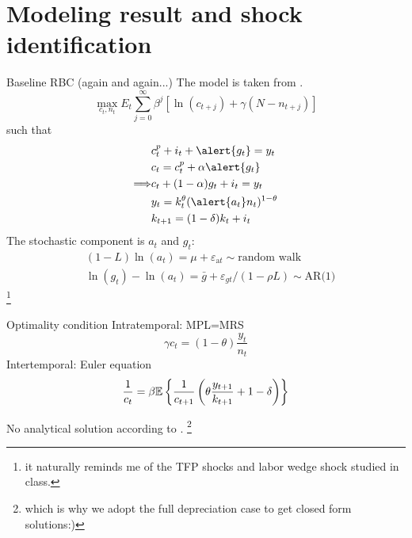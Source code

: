 \documentclass[10pt]{beamer}
\begin{document}
\section{Modeling result and shock identification}

\begin{frame}{Baseline RBC (again and again...)}
    The model is taken from \cite{christiano_eichenbaum_2020}.
    \begin{equation}
        \max_{c_t,n_t} E_{t} \sum_{j=0}^{\infty} \beta^{j} \left[\ln (c_{t+j})+\gamma(N-n_{t+j})\right]
    \end{equation}
    such that
    \begin{align*}
                        & c_t^p + i_t + \alert{g_t} = y_t                 \\
                        & c_t = c_t^p+\alpha \alert{g_t}                  \\
        \Longrightarrow & c_t + (1-\alpha)g_t +i_t=y_t                    \\
                        & y_t = k_t^{\theta} (\alert{a_t} n_t)^{1-\theta} \\
                        & k_{t+1} = (1-\delta) k_t + i_t                  \\
    \end{align*}
    The \alert{stochastic} component is $a_t$ and $g_t$:
    \begin{align}
         & (1-L) \ln \left(a_{t}\right)=\mu+\varepsilon_{\mathrm{a} t}            \sim \text{random walk}        \\
         & \ln \left(g_{t}\right)-\ln \left(a_{t}\right)=\bar{g}+\varepsilon_{g t} /(1-\rho L) \sim \text{AR(1)}
    \end{align}\footnote{it naturally reminds me of the TFP shocks and labor wedge shock studied in class.}
\end{frame}
\begin{frame}{Optimality condition}
    Intratemporal: MPL=MRS
    \begin{equation}
        \gamma c_t = (1-\theta)\frac{y_t}{n_t}
    \end{equation}
    Intertemporal: Euler equation
    \begin{equation}
        \frac{1}{c_t}=\beta \mathbb{E}\left\{\frac{1}{c_{t+1}}\left(\theta\frac{y_{t+1}}{k_{t+1}}+1-\delta\right)\right\}
    \end{equation}

    \alert{No analytical solution} according to \cite{christiano_eichenbaum_2020}. \footnote{which is why we adopt the full depreciation case to get closed form solutions:)}

\end{frame}
\end{document}

